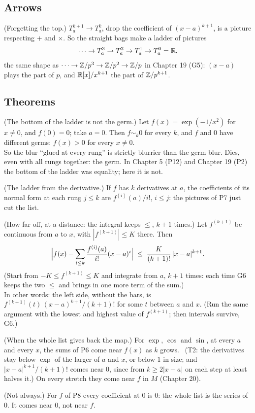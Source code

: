 \subsection*{Arrows}

\begin{lines}
\item[\lab{P7}] (Forgetting the top.) $T^{k+1}_a \to T^k_a$, drop the coefficient of $(x - a)^{k+1}$, is a picture respecting $+$ and $\times$. So the straight bags make a ladder of pictures
\[
\dots \to T^3_a \to T^2_a \to T^1_a \to T^0_a = \mathbb{R} ,
\]
the same shape as $\dots \to \mathbb{Z}/p^3 \to \mathbb{Z}/p^2 \to \mathbb{Z}/p$ in Chapter 19 (G5): $(x - a)$ plays the part of $p$, and $\mathbb{R}[x]/x^{k+1}$ the part of $\mathbb{Z}/p^{k+1}$.
\end{lines}

\subsection*{Theorems}

\begin{lines}
\item[\lab{P8}] (The bottom of the ladder is not the germ.) Let $f(x) = \exp(-1/x^2)$ for $x \neq 0$, and $f(0) = 0$; take $a = 0$. Then $f \sim_k 0$ for every $k$, and $f$ and $0$ have different germs: $f(x) > 0$ for every $x \neq 0$. \\
So the blur ``glued at every rung'' is strictly blurrier than the germ blur. Dies, even with all rungs together: the germ. In Chapter 5 (P12) and Chapter 19 (P2) the bottom of the ladder was equality; here it is not.
\item[\lab{T1}] (The ladder from the derivative.) If $f$ has $k$ derivatives at $a$, the coefficients of its normal form at each rung $j \le k$ are $f^{(i)}(a)/i!$, $i \le j$: the pictures of P7 just cut the list.
\item[\lab{T2}] (How far off, at a distance: the integral keeps $\le$, $k + 1$ times.) Let $f^{(k+1)}$ be continuous from $a$ to $x$, with $|f^{(k+1)}| \le K$ there. Then
\[
\Bigl| f(x) - \sum_{i \le k} \frac{f^{(i)}(a)}{i!}(x - a)^i \Bigr| \;\le\; \frac{K}{(k+1)!}\,|x - a|^{k+1} .
\]
(Start from $-K \le f^{(k+1)} \le K$ and integrate from $a$, $k + 1$ times: each time G6 keeps the two $\le$ and brings in one more term of the sum.) \\
In other words: the left side, without the bars, is $f^{(k+1)}(t)\,(x - a)^{k+1}/(k+1)!$ for some $t$ between $a$ and $x$. (Run the same argument with the lowest and highest value of $f^{(k+1)}$; then intervals survive, G6.)
\item[\lab{T3}] (When the whole list gives back the map.) For $\exp$, $\cos$ and $\sin$, at every $a$ and every $x$, the sums of P6 come near $f(x)$ as $k$ grows. \ (T2: the derivatives stay below $\exp$ of the larger of $a$ and $x$, or below $1$ in size; and $|x - a|^{k+1}/(k+1)!$ comes near $0$, since from $k \ge 2|x - a|$ on each step at least halves it.) On every stretch they come near $f$ in $M$ (Chapter 20).
\item[\lab{T4}] (Not always.) For $f$ of P8 every coefficient at $0$ is $0$: the whole list is the series of $0$. It comes near $0$, not near $f$.
\end{lines}

